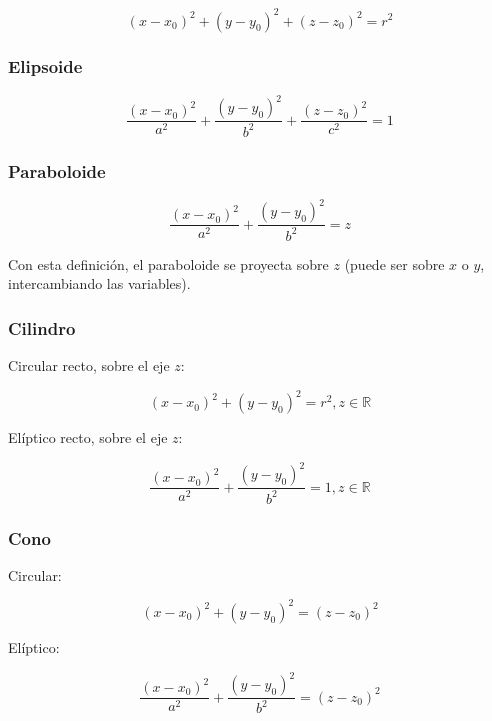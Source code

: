\documentclass{article}
\renewcommand{\Bbb}{\mathbb}
\begin{document}
\begin{equation}
(x-x_0)^2 + (y-y_0)^2 + (z-z_0)^2 = r^2
\end{equation}

\subsubsection{Elipsoide}

\begin{equation}
\frac{(x-x_0)^2}{a^2} + \frac{(y-y_0)^2}{b^2} + \frac{(z-z_0)^2}{c^2} = 1
\end{equation}

\subsubsection{Paraboloide}

\begin{equation}
\frac{(x-x_0)^2}{a^2} + \frac{(y-y_0)^2}{b^2} = z
\end{equation}

Con esta definición, el paraboloide se proyecta sobre $z$ (puede ser sobre $x$ o $y$, intercambiando las variables).

\subsubsection{Cilindro}

Circular recto, sobre el eje $z$:

\begin{equation}
(x-x_0)^2 + (y-y_0)^2 = r^2, z \in \Bbb R
\end{equation}

Elíptico recto, sobre el eje $z$:

\begin{equation}
\frac{(x-x_0)^2}{a^2} + \frac{(y-y_0)^2}{b^2} = 1, z \in \Bbb R
\end{equation}

\subsubsection{Cono}

Circular:

\begin{equation}
(x-x_0)^2 + (y-y_0)^2 = (z-z_0)^2
\end{equation}

Elíptico:

\begin{equation}
\frac{(x-x_0)^2}{a^2} + \frac{(y-y_0)^2}{b^2} = (z-z_0)^2
\end{equation}
\end{document}

